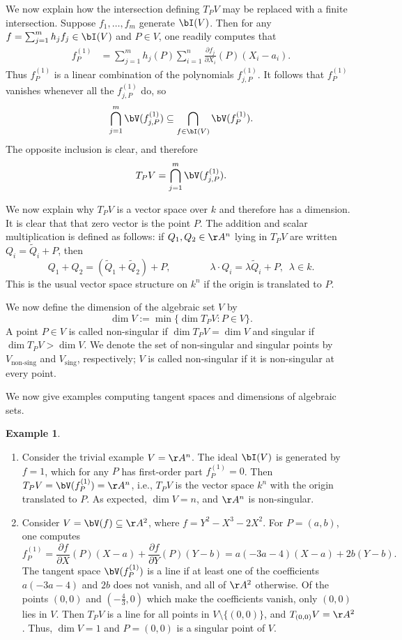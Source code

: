\documentclass[12pt]{amsart}
\theoremstyle{plain}
\theoremstyle{definition}
\newtheorem{example}[theorem]{Example}
\begin{document}
We now explain how the intersection defining $T_PV$ may be replaced with a finite intersection.
Suppose $f_1, \ldots, f_m$ generate $\bI(V)$.
Then for any $f = \sum_{j=1}^m h_j f_j \in \bI(V)$ and $P \in V$, one readily computes that
\begin{align*}
	f_P^{(1)} &= \sum_{j=1}^m h_j(P) \sum_{i=1}^n \frac{\partial f_j}{\partial X_i}(P)(X_i-a_i).
\end{align*}
Thus $f_P^{(1)}$ is a linear combination of the polynomials $f_{j,P}^{(1)}$.
It follows that $f_P^{(1)}$ vanishes whenever all the $f_{j,P}^{(1)}$ do, so
$$\bigcap_{j=1}^m \bV(f_{j,P}^{(1)}) \subseteq \bigcap_{f \in \bI(V)} \bV(f_P^{(1)}).$$
The opposite inclusion is clear, and therefore
$$T_PV=\bigcap_{j=1}^m \bV(f_{j,P}^{(1)}).$$

We now explain why $T_PV$ is a vector space over $k$ and therefore has a dimension.
It is clear that that zero vector is the point $P$.
The addition and scalar multiplication is defined as follows: if $Q_1, Q_2 \in \AA^n$ lying in $T_PV$ are written $Q_i = \tilde Q_i + P$, then
$$Q_1 + Q_2 = (\tilde Q_1 + \tilde Q_2) + P, \qquad\qquad \lambda \cdot Q_i = \lambda \tilde Q_i + P, \,\,\, \lambda \in k.$$
This is the usual vector space structure on $k^n$ if the origin is translated to $P$.

We now define the dimension of the algebraic set $V$ by
$$\dim V := \min\{\dim T_PV : P \in V\}.$$
A point $P \in V$ is called non-singular if $\dim T_PV = \dim V$ and singular if $\dim T_P V > \dim V$.
We denote the set of non-singular and singular points by $V_{\text{non-sing}}$ and $V_{\text{sing}}$, respectively;
$V$ is called non-singular if it is non-singular at every point.

We now give examples computing tangent spaces and dimensions of algebraic sets.

\begin{example}
\begin{enumerate}
\item
Consider the trivial example $V = \AA^n$.
The ideal $\bI(V)$ is generated by $f = 1$, which for any $P$ has first-order part $f_P^{(1)} = 0$.
Then $T_PV = \bV(f_P^{(1)}) = \AA^n$, i.e., $T_PV$ is the vector space $k^n$ with the origin translated to $P$.
As expected, $\dim V = n$, and $\AA^n$ is non-singular.

\item
Consider $V = \bV(f) \subseteq \AA^2$, where $f = Y^2 - X^3 - 2X^2$.
For $P = (a, b)$, one computes
$$f_P^{(1)} = \frac{\partial f}{\partial X}(P)(X-a) + \frac{\partial f}{\partial Y}(P)(Y-b) = a(-3a-4)(X - a) + 2b(Y-b).$$ 
The tangent space $\bV(f_P^{(1)})$ is a line if at least one of the coefficients $a(-3a-4)$ and $2b$ does not vanish, and all of $\AA^2$ otherwise.
Of the points $(0, 0)$ and $(-\frac{4}{3}, 0)$ which make the coefficients vanish, only $(0, 0)$ lies in $V$.
Then $T_PV$ is a line for all points in $V\setminus\{(0, 0)\}$, and $T_{(0,0)}V = \AA^2$.
Thus, $\dim V = 1$ and $P = (0, 0)$ is a singular point of $V$.
\end{enumerate}
\end{example}
\end{document}
